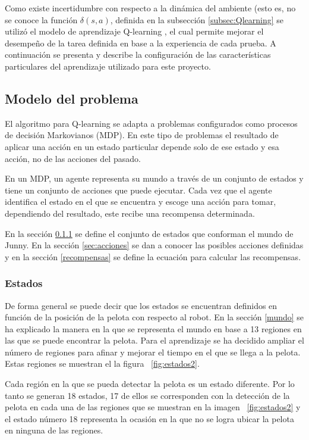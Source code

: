 Como existe incertidumbre con respecto a la dinámica del ambiente (esto es, no se conoce la función $\delta(s,a)$, definida en la subsección \ref{subsec:Qlearning} se utilizó el modelo de aprendizaje Q-learning \cite{Mitchell}, el cual permite mejorar el desempeño de la tarea definida en base a la experiencia de cada prueba. A continuación se presenta y describe la configuración de las caracter\'isticas particulares del aprendizaje utilizado para este proyecto.

\subsection{Modelo del problema}

El algoritmo para Q-learning se adapta a problemas configurados como procesos de decisión Markovianos (MDP). En este tipo de problemas el resultado de aplicar una acción en un estado particular depende solo de ese estado y esa acción, no de las acciones del pasado. 

En un MDP, un agente representa su mundo a través de un conjunto de estados y tiene un conjunto de acciones que puede ejecutar. Cada vez que el agente identifica el estado en el que se encuentra y escoge una acción para tomar, dependiendo del resultado, este recibe una recompensa determinada.

En la sección \ref{estados} se define el conjunto de estados que conforman el mundo de Junny. En la secci\'on \ref{sec:acciones} se dan a conocer las posibles acciones definidas y en la secci\'on \ref{recompensas} se define la ecuaci\'on para calcular las recompensas.   

\subsubsection{Estados}\label{estados}

De forma general se puede decir que los estados se encuentran definidos en función de la posición de la pelota con respecto al robot. En la sección \ref{mundo} se ha explicado la manera en la que se representa el mundo en base a 13 regiones en las que se puede encontrar la pelota. Para el aprendizaje se ha decidido ampliar el número de regiones para afinar y mejorar el tiempo en el que se llega a la pelota. Estas regiones se muestran el la figura ~\ref{fig:estados2}.

Cada región en la que se pueda detectar la pelota es un estado diferente. Por lo tanto se generan 18 estados, 17 de ellos se corresponden con la detección de la pelota en cada una de las regiones que se muestran en la imagen ~\ref{fig:estados2} y el estado número 18 representa la ocasión en la que no se logra ubicar la pelota en ninguna de las regiones.  

